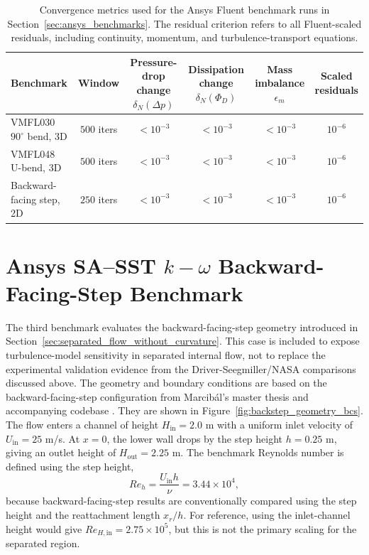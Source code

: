 \begin{table}[!ht]
	\centering
	\scriptsize
	\caption{Convergence metrics used for the Ansys Fluent benchmark runs in Section~\ref{sec:ansys_benchmarks}. The residual criterion refers to all Fluent-scaled residuals, including continuity, momentum, and turbulence-transport equations.}
	\label{tab:ch2_ansys_convergence_metrics}
	\renewcommand{\arraystretch}{1.2}
	\begin{tabularx}{\textwidth}{X c c c c c}
		\hline
		\textbf{Benchmark} &
		\textbf{Window} &
		\shortstack{\textbf{Pressure-drop}\\\textbf{change}\\$\delta_N(\Delta p)$} &
		\shortstack{\textbf{Dissipation}\\\textbf{change}\\$\delta_N(\Phi_D)$} &
		\shortstack{\textbf{Mass}\\\textbf{imbalance}\\$\epsilon_m$} &
		\shortstack{\textbf{Scaled}\\\textbf{residuals}} \\
		\hline
		VMFL030 $90^\circ$ bend, 3D & $500$ iters & $<10^{-3}$ & $<10^{-3}$ & $<10^{-3}$ & $10^{-6}$ \\
		VMFL048 U-bend, 3D & $500$ iters & $<10^{-3}$ & $<10^{-3}$ & $<10^{-3}$ & $10^{-6}$ \\
		Backward-facing step, 2D & $250$ iters & $<10^{-3}$ & $<10^{-3}$ & $<10^{-3}$ & $10^{-6}$ \\
		\hline
	\end{tabularx}
\end{table}

\section{Ansys SA--\texorpdfstring{SST $k-\omega$}{SST k-omega} Backward-Facing-Step Benchmark}
\label{sec:app_A_backstep_ansys_comparison}
The third benchmark evaluates the backward-facing-step geometry introduced in Section~\ref{sec:separated_flow_without_curvature}. This case is included to expose turbulence-model sensitivity in separated internal flow, not to replace the experimental validation evidence from the Driver-Seegmiller/NASA comparisons discussed above. The geometry and boundary conditions are based on the backward-facing-step configuration from Marcib\'{a}l's master thesis and accompanying codebase \cite{Marcibal2024,joove_keps}. They are shown in Figure~\ref{fig:backstep_geometry_bcs}. The flow enters a channel of height $H_\mathrm{in}=2.0$ m with a uniform inlet velocity of $U_\mathrm{in}=25$ m/s. At $x=0$, the lower wall drops by the step height $h=0.25$ m, giving an outlet height of $H_\mathrm{out}=2.25$ m. The benchmark Reynolds number is defined using the step height,
\begin{equation}
	Re_h = \frac{U_\mathrm{in} h}{\nu} = 3.44 \times 10^4 ,
\end{equation}
because backward-facing-step results are conventionally compared using the step height and the reattachment length $x_r/h$. For reference, using the inlet-channel height would give $Re_{H,\mathrm{in}} = 2.75 \times 10^5$, but this is not the primary scaling for the separated region.

